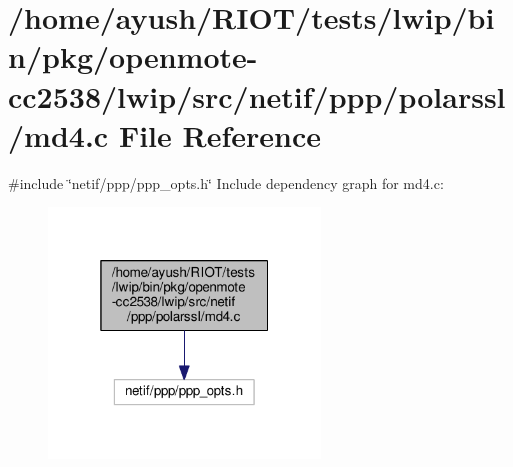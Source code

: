 \hypertarget{openmote-cc2538_2lwip_2src_2netif_2ppp_2polarssl_2md4_8c}{}\section{/home/ayush/\+R\+I\+O\+T/tests/lwip/bin/pkg/openmote-\/cc2538/lwip/src/netif/ppp/polarssl/md4.c File Reference}
\label{openmote-cc2538_2lwip_2src_2netif_2ppp_2polarssl_2md4_8c}
{\ttfamily \#include \char`\"{}netif/ppp/ppp\+\_\+opts.\+h\char`\"{}}\newline
Include dependency graph for md4.\+c\+:
\nopagebreak
\begin{figure}[H]
\begin{center}
\leavevmode
\includegraphics[width=205pt]{openmote-cc2538_2lwip_2src_2netif_2ppp_2polarssl_2md4_8c__incl}
\end{center}
\end{figure}
